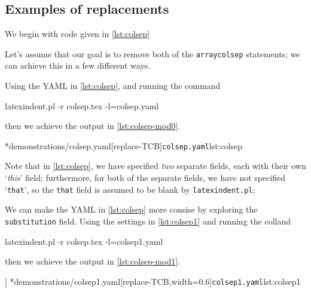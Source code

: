 \subsection{Examples of replacements}
\begin{example}
  We begin with code given in \cref{lst:colsep}


        Let's assume that our goal is to remove both of the \texttt{arraycolsep} statements; we can achieve this in 
        a few different ways.
    
        Using the YAML in \cref{lst:colsep}, and running the command
\begin{commandshell}
latexindent.pl -r colsep.tex -l=colsep.yaml
\end{commandshell}
then we achieve the output in \cref{lst:colsep-mod0}.
        \begin{cmhtcbraster}[raster column skip=.01\linewidth]
		\cmhlistingsfromfile*[style=yaml-LST]*{demonstrations/colsep.yaml}[replace-TCB]{\texttt{colsep.yaml}}{lst:colsep}
        \end{cmhtcbraster}
        Note that in \cref{lst:colsep}, we have specified \emph{two} separate fields, each with their own `\emph{this}' field;
            furthermore, for both of the separate fields, we have not specified `\texttt{that}', so the \texttt{that} field 
            is assumed to be blank by \texttt{latexindent.pl};

            We can make the YAML in \cref{lst:colsep} more consise by exploring the \texttt{substitution} field. Using 
            the settings in \cref{lst:colsep1} and running the colland
\begin{commandshell}
latexindent.pl -r colsep.tex -l=colsep1.yaml
\end{commandshell}
then we achieve the output in \cref{lst:colsep-mod1}.
        \begin{cmhtcbraster}[raster column skip=.01\linewidth,
            raster force size=false,
            raster column 1/.style={add to width=-.1\textwidth}]
          ]
		\cmhlistingsfromfile*[style=yaml-LST]*{demonstrations/colsep1.yaml}[replace-TCB,width=0.6\textwidth]{\texttt{colsep1.yaml}}{lst:colsep1}
        \end{cmhtcbraster}


\end{example}
